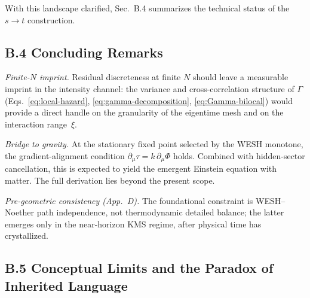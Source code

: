 \documentclass[12pt,a4paper]{article}
\numberwithin{equation}{section}
\begin{document}
\vspace{0.5cm}

\noindent With this landscape clarified, Sec.~B.4 summarizes the technical status of the $s \to t$ construction.

\vspace{0.8cm}

\subsection*{B.4 Concluding Remarks}
\vspace{0.5cm}

\noindent\textit{Finite-$N$ imprint.}
Residual discreteness at finite $N$ should leave a measurable imprint in the intensity channel: the variance and cross-correlation structure of $\Gamma$ (Eqs.~\eqref{eq:local-hazard}, \eqref{eq:gamma-decomposition}, 
\eqref{eq:Gamma-bilocal}) would provide a direct handle on the granularity of the eigentime mesh and on the interaction range~$\xi$.

\smallskip
\noindent\textit{Bridge to gravity.}
At the stationary fixed point selected by the WESH monotone, the gradient-alignment condition $\partial_\mu\tau = k\,\partial_\mu\Phi$ holds. Combined with hidden-sector cancellation, this is expected to yield the emergent Einstein equation with matter. The full derivation lies beyond the present scope.

\smallskip
\noindent\textit{Pre-geometric consistency (App.~D).}
The foundational constraint is WESH--Noether path independence, not thermodynamic detailed balance; the latter emerges only in the near-horizon KMS regime, after physical time has crystallized.

\vspace{0.8cm}

\subsection*{B.5 Conceptual Limits and the Paradox of Inherited Language}
\end{document}
